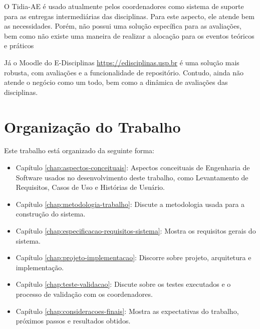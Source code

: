 O Tidia-AE é usado atualmente pelos coordenadores como sistema de suporte para as entregas intermediárias das disciplinas. Para este aspecto, ele atende bem as necessidades. Porém, não possui uma solução específica para as avaliações, bem como não existe uma maneira de realizar a alocação para os eventos teóricos e práticos

Já o Moodle do E-Disciplinas \href{https://edisciplinas.usp.br}{https://edisciplinas.usp.br} é uma solução mais robusta, com avaliações e a funcionalidade de repositório. Contudo, ainda não atende o negócio como um todo, bem como a dinâmica de avaliações das disciplinas.

\section{Organização do Trabalho}
Este trabalho está organizado da seguinte forma:

\begin{itemize}
    \item Capítulo \ref{chap:aspectos-conceituais}: Aspectos conceituais de Engenharia de Software usados no desenvolvimento deste trabalho, como Levantamento de Requisitos, Casos de Uso e Histórias de Usuário.
    \item Capítulo \ref{chap:metodologia-trabalho}: Discute a metodologia usada para a construção do sistema.
    \item Capítulo \ref{chap:especificacao-requisitos-sistema}: Mostra os requisitos gerais do sistema.
    \item Capítulo \ref{chap:projeto-implementacao}: Discorre sobre projeto, arquitetura e implementação.
    \item Capítulo \ref{chap:teste-validacao}: Discute sobre os testes executados e o processo de validação com os coordenadores.
    \item Capítulo \ref{chap:consideracoes-finais}: Mostra as expectativas do trabalho, próximos passos e resultados obtidos.
\end{itemize}
